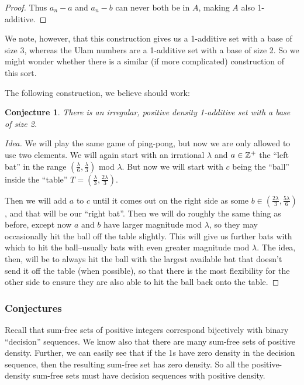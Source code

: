 \documentclass{article}
\newtheorem{conjecture}[theorem]{Conjecture}
\theoremstyle{definition}
\theoremstyle{remark}
\numberwithin{equation}{section}
\begin{document}
{\begin{proof}
  Thus $a_n - a$ and $a_n - b$ can never both be in $A$, making $A$
  also 1-additive.
\end{proof}

We note, however, that this construction gives us a 1-additive set
with a base of size 3, whereas the Ulam numbers are a 1-additive set
with a base of size 2.  So we might wonder whether there is a similar
(if more complicated) construction of this sort.

The following construction, we believe should work: 

\begin{conjecture}
  There is an irregular, positive density 1-additive set with a base
  of size 2.
\end{conjecture}

\begin{proof}[Idea]
  We will play the same game of ping-pong, but now we are only allowed
  to use two elements.  We will again start with an irrational
  $\lambda$ and $a \in \mathbb{Z}^+$ the ``left bat'' in the range
  $(\frac{\lambda}{6}, \frac{\lambda}{3})$ mod $\lambda$.  But now we
  will start with $c$ being the ``ball'' inside the ``table''
  $T = (\frac{\lambda}{3}, \frac{2\lambda}{3})$.

  Then we will add $a$ to $c$ until it comes out on the right side as
  some $b \in (\frac{2\lambda}{3}, \frac{5\lambda}{6})$, and that will
  be our ``right bat''.  Then we will do roughly the same thing as
  before, except now $a$ and $b$ have larger magnitude mod $\lambda$,
  so they may occasionally hit the ball off the table slightly.  This
  will give us further bats with which to hit the ball--usually bats
  with even greater magnitude mod $\lambda$.  The idea, then, will be
  to always hit the ball with the largest available bat that doesn't
  send it off the table (when possible), so that there is the most
  flexibility for the other side to ensure they are also able to hit
  the ball back onto the table.  
\end{proof}

\subsubsection{Conjectures}

Recall that sum-free sets of positive integers correspond bijectively
with binary ``decision'' sequences.  We know also that there are many
sum-free sets of positive density.  Further, we can easily see that if
the 1s have zero density in the decision sequence, then the resulting
sum-free set has zero density.  So all the positive-density sum-free
sets must have decision sequences with positive density.  

}
\end{document}
